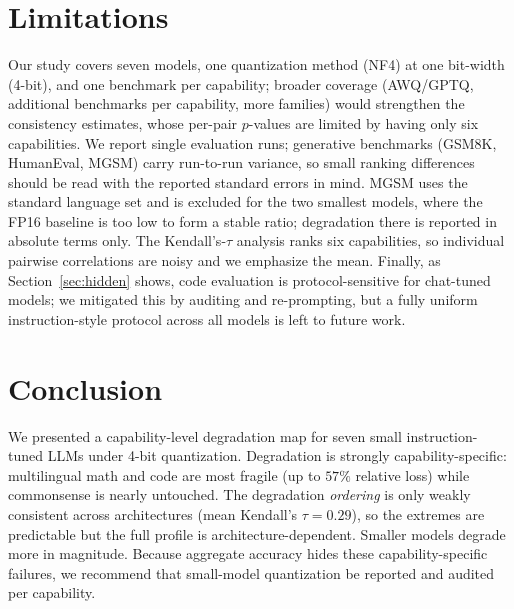 \documentclass[11pt]{article}
\begin{document}
\section*{Limitations}

Our study covers seven models, one quantization method (NF4) at one bit-width
(4-bit), and one benchmark per capability; broader coverage (AWQ/GPTQ, additional
benchmarks per capability, more families) would strengthen the consistency
estimates, whose per-pair $p$-values are limited by having only six capabilities.
We report single evaluation runs; generative benchmarks (GSM8K, HumanEval, MGSM)
carry run-to-run variance, so small ranking differences should be read with the
reported standard errors in mind. MGSM uses the standard language set and is
excluded for the two smallest models, where the FP16 baseline is too low to form
a stable ratio; degradation there is reported in absolute terms only. The
Kendall's-$\tau$ analysis ranks six capabilities, so individual pairwise
correlations are noisy and we emphasize the mean. Finally, as
Section~\ref{sec:hidden} shows, code evaluation is protocol-sensitive for
chat-tuned models; we mitigated this by auditing and re-prompting, but a fully
uniform instruction-style protocol across all models is left to future work.

\section{Conclusion}

We presented a capability-level degradation map for seven small instruction-tuned
LLMs under 4-bit quantization. Degradation is strongly capability-specific:
multilingual math and code are most fragile (up to $57\%$ relative loss) while
commonsense is nearly untouched. The degradation \emph{ordering} is only weakly
consistent across architectures (mean Kendall's $\tau=0.29$), so the extremes are
predictable but the full profile is architecture-dependent. Smaller models
degrade more in magnitude. Because aggregate accuracy hides these
capability-specific failures, we recommend that small-model quantization be
reported and audited per capability.



\end{document}
